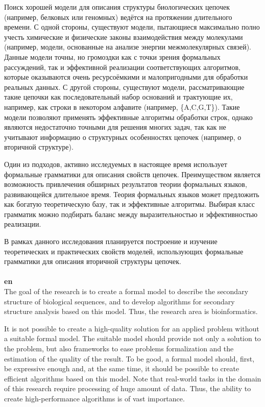 \documentclass[12pt]{article}  %
\theoremstyle{remark}
\begin{document}
Поиск хорошей модели для описания структуры биологических цепочек (например, белковых или геномных) ведётся на протяжении длительного времени.
С одной стороны, существуют модели, пытающиеся максимально полно учесть химические и физические законы взаимодействия между молекулами (например, модели, основанные на анализе энергии межмолекулярных связей).
Данные модели точны, но громоздки как с точки зрения формальных рассуждений, так и эффективной реализации соответствующих алгоритмов, которые оказываются очень ресурсоёмкими и малопригодными для обработки реальных данных.
С другой стороны, существуют модели, рассматривающие такие цепочки как последовательный набор оснований и трактующие их, например, как строки в некотором алфавите (например, \{A,C,G,T\}).
Такие модели позволяют применять эффективные алгоритмы обработки строк, однако являются недостаточно точными для решения многих задач, так как не учитывают информацию о структурных особенностях цепочек (например, о вторичной структуре).

Один из подходов, активно исследуемых в настоящее время использует формальные грамматики для описания свойств цепочек.
Преимуществом является возможность привлечения обширных результатов теории формальных языков, развивающейся длительное время.
Теория формальных языков может предложить как богатую теоретическую базу, так и эффективные алгоритмы.
Выбирая класс грамматик можно подбирать баланс между выразительностью и эффективностью реализации.

В рамках данного исследования планируется построение и изучение теоретических и практических свойств моделей, использующих формальные грамматики для описания вторичной структуры цепочек.
\\
\\
\textbf{en}\\
The goal of the research is to create a formal model to describe the secondary structure of biological sequences, and to develop algorithms for secondary structure analysis based on this model.
Thus, the research area is bioinformatics.

It is not possible to create a high-quality solution for an applied problem without a suitable formal model.
The suitable model should provide not only a solution to the problem, but also frameworks to ease problems formalization and the estimation of the quality of the result.
To be good, a formal model should, first, be expressive enough and, at the same time, it should be possible to create efficient algorithms based on this model.
Note that real-world tasks in the domain of this research require processing of huge amount of data.
Thus, the ability to create high-performance algorithms is of vast importance.
\end{document}
